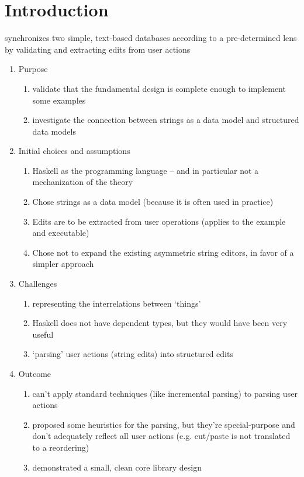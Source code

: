 \section{Introduction}
\label{sec:impl-intro}
synchronizes two simple, text-based databases according to a pre-determined lens by validating and extracting edits from user actions
\begin{enumerate}
    \item Purpose
        \begin{enumerate}
            \item validate that the fundamental design is complete enough to implement some examples
            \item investigate the connection between strings as a data model and structured data models
        \end{enumerate}
    \item Initial choices and assumptions
        \begin{enumerate}
            \item Haskell as the programming language -- and in particular not a mechanization of the theory
            \item Chose strings as a data model (because it is often used in practice)
            \item Edits are to be extracted from user operations (applies to the example and executable)
            \item Chose not to expand the existing asymmetric string editors, in favor of a simpler approach
        \end{enumerate}
    \item Challenges
        \begin{enumerate}
            \item representing the interrelations between `things'
            \item Haskell does not have dependent types, but they would have been very useful
            \item `parsing' user actions (string edits) into structured edits
        \end{enumerate}
    \item Outcome
        \begin{enumerate}
            \item can't apply standard techniques (like incremental parsing) to parsing user actions
            \item proposed some heuristics for the parsing, but they're special-purpose and don't adequately reflect all user actions (e.g. cut/paste is not translated to a reordering)
            \item demonstrated a small, clean core library design
        \end{enumerate}
\end{enumerate}

